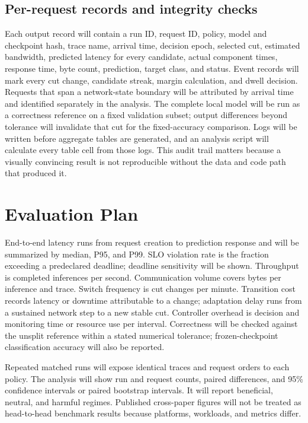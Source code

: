 \documentclass[10pt,a4paper,twocolumn]{article}
\begin{document}
\subsection{Per-request records and integrity checks}
Each output record will contain a run ID, request ID, policy, model and checkpoint hash, trace name, arrival time, decision epoch, selected cut, estimated bandwidth, predicted latency for every candidate, actual component times, response time, byte count, prediction, target class, and status. Event records will mark every cut change, candidate streak, margin calculation, and dwell decision. Requests that span a network-state boundary will be attributed by arrival time and identified separately in the analysis. The complete local model will be run as a correctness reference on a fixed validation subset; output differences beyond tolerance will invalidate that cut for the fixed-accuracy comparison. Logs will be written before aggregate tables are generated, and an analysis script will calculate every table cell from those logs. This audit trail matters because a visually convincing result is not reproducible without the data and code path that produced it.

\section{Evaluation Plan}\label{sec:evaluation}
End-to-end latency runs from request creation to prediction response and will be summarized by median, P95, and P99. SLO violation rate is the fraction exceeding a predeclared deadline; deadline sensitivity will be shown. Throughput is completed inferences per second. Communication volume covers bytes per inference and trace. Switch frequency is cut changes per minute. Transition cost records latency or downtime attributable to a change; adaptation delay runs from a sustained network step to a new stable cut. Controller overhead is decision and monitoring time or resource use per interval. Correctness will be checked against the unsplit reference within a stated numerical tolerance; frozen-checkpoint classification accuracy will also be reported.

Repeated matched runs will expose identical traces and request orders to each policy. The analysis will show run and request counts, paired differences, and 95\% confidence intervals or paired bootstrap intervals. It will report beneficial, neutral, and harmful regimes. Published cross-paper figures will not be treated as head-to-head benchmark results because platforms, workloads, and metrics differ.
\end{document}
